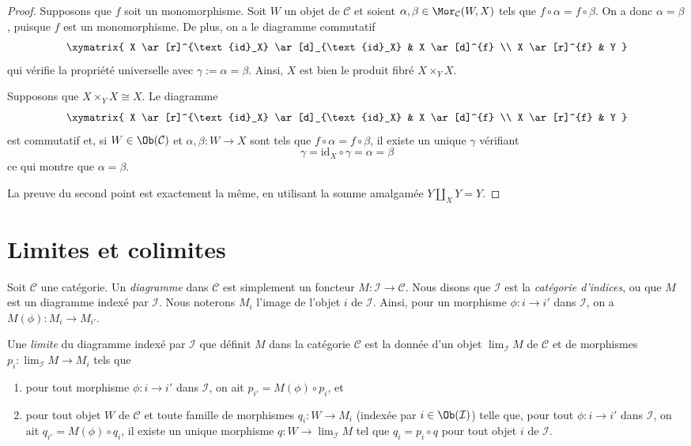 \begin{proof}
Supposons que $f$ soit un monomorphisme. Soit $W$ un objet de $\mathcal C$
et soient $\alpha, \beta \in \Mor_\mathcal C(W,X)$ tels que
$f\circ \alpha = f\circ
\beta$. On a donc $\alpha = \beta$,
puisque $f$ est un monomorphisme. De plus, on a le diagramme commutatif
$$
\xymatrix{
X \ar[r]^{\text{id}_X} \ar[d]_{\text{id}_X} & X \ar[d]^{f} \\
X \ar[r]^{f} & Y
}
$$
qui vérifie la propriété universelle avec $\gamma := \alpha = \beta$.
Ainsi, $X$ est bien le produit fibré $X\times_Y X$.

\medskip\noindent
Supposons que $X \times_Y X \cong X $.
Le diagramme
$$
\xymatrix{
X \ar[r]^{\text{id}_X} \ar[d]_{\text{id}_X} & X \ar[d]^{f} \\
X \ar[r]^{f} & Y }
$$
est commutatif et, si $W \in \Ob(\mathcal C)$ et
$\alpha, \beta : W \to X$ sont tels que
$f \circ \alpha = f \circ \beta$, il existe un unique
$\gamma$ vérifiant
$$
\gamma = \text{id}_X\circ\gamma = \alpha = \beta
$$
ce qui montre que $\alpha = \beta$.

\medskip\noindent
La preuve du second point est exactement la même, en utilisant la somme amalgamée
$Y\amalg_X Y = Y$.
\end{proof}





\section{Limites et colimites}
\label{section-limits}

\noindent
Soit $\mathcal{C}$ une catégorie. Un {\it diagramme} dans $\mathcal{C}$ est
simplement un foncteur $M : \mathcal{I} \to \mathcal{C}$. Nous disons que
$\mathcal{I}$ est la {\it catégorie d'indices}, ou que $M$ est un
diagramme indexé par $\mathcal{I}$. Nous noterons $M_i$ l'image de l'objet
$i$ de $\mathcal{I}$. Ainsi, pour un morphisme $\phi : i \to i'$
dans $\mathcal{I}$, on a $M(\phi) : M_i \to M_{i'}$.

\begin{definition}
\label{definition-limit}
Une {\it limite} du diagramme indexé par $\mathcal{I}$ que définit $M$ dans la
catégorie
$\mathcal{C}$ est la donnée d'un objet $\lim_\mathcal{I} M$ de $\mathcal{C}$
et de morphismes $p_i : \lim_\mathcal{I} M \to M_i$ tels que
\begin{enumerate}
\item pour tout morphisme $\phi : i \to i'$
dans $\mathcal{I}$, on ait $p_{i'} = M(\phi) \circ p_i$, et
\item pour tout objet $W$ de $\mathcal{C}$ et toute famille de
morphismes $q_i : W \to M_i$ (indexée par $i \in \Ob(\mathcal{I})$)
telle que, pour tout $\phi : i \to i'$
dans $\mathcal{I}$, on ait $q_{i'} = M(\phi) \circ q_i$, il existe
un unique morphisme $q : W \to \lim_\mathcal{I} M$ tel que
$q_i = p_i \circ q$ pour tout objet $i$ de $\mathcal{I}$.
\end{enumerate}
\end{definition}

